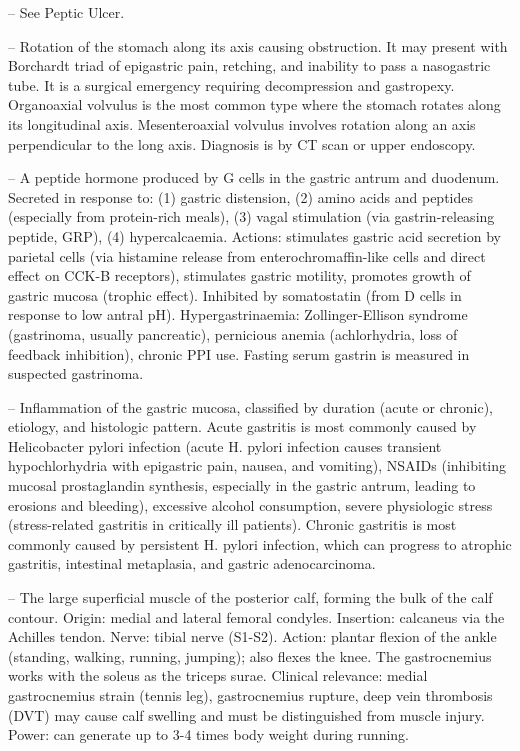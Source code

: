 -- See Peptic Ulcer.

-- Rotation of the stomach along its axis causing obstruction. It may present with Borchardt triad of epigastric pain, retching, and inability to pass a nasogastric tube. It is a surgical emergency requiring decompression and gastropexy. Organoaxial volvulus is the most common type where the stomach rotates along its longitudinal axis. Mesenteroaxial volvulus involves rotation along an axis perpendicular to the long axis. Diagnosis is by CT scan or upper endoscopy.

-- A peptide hormone produced by G cells in the gastric antrum and duodenum. Secreted in response to: (1) gastric distension, (2) amino acids and peptides (especially from protein-rich meals), (3) vagal stimulation (via gastrin-releasing peptide, GRP), (4) hypercalcaemia. Actions: stimulates gastric acid secretion by parietal cells (via histamine release from enterochromaffin-like cells and direct effect on CCK-B receptors), stimulates gastric motility, promotes growth of gastric mucosa (trophic effect). Inhibited by somatostatin (from D cells in response to low antral pH). Hypergastrinaemia: Zollinger-Ellison syndrome (gastrinoma, usually pancreatic), pernicious anemia (achlorhydria, loss of feedback inhibition), chronic PPI use. Fasting serum gastrin is measured in suspected gastrinoma.

-- Inflammation of the gastric mucosa, classified by duration (acute or chronic), etiology, and histologic pattern. Acute gastritis is most commonly caused by Helicobacter pylori infection (acute H. pylori infection causes transient hypochlorhydria with epigastric pain, nausea, and vomiting), NSAIDs (inhibiting mucosal prostaglandin synthesis, especially in the gastric antrum, leading to erosions and bleeding), excessive alcohol consumption, severe physiologic stress (stress-related gastritis in critically ill patients). Chronic gastritis is most commonly caused by persistent H. pylori infection, which can progress to atrophic gastritis, intestinal metaplasia, and gastric adenocarcinoma.

-- The large superficial muscle of the posterior calf, forming the bulk of the calf contour. Origin: medial and lateral femoral condyles. Insertion: calcaneus via the Achilles tendon. Nerve: tibial nerve (S1-S2). Action: plantar flexion of the ankle (standing, walking, running, jumping); also flexes the knee. The gastrocnemius works with the soleus as the triceps surae. Clinical relevance: medial gastrocnemius strain (tennis leg), gastrocnemius rupture, deep vein thrombosis (DVT) may cause calf swelling and must be distinguished from muscle injury. Power: can generate up to 3-4 times body weight during running.

